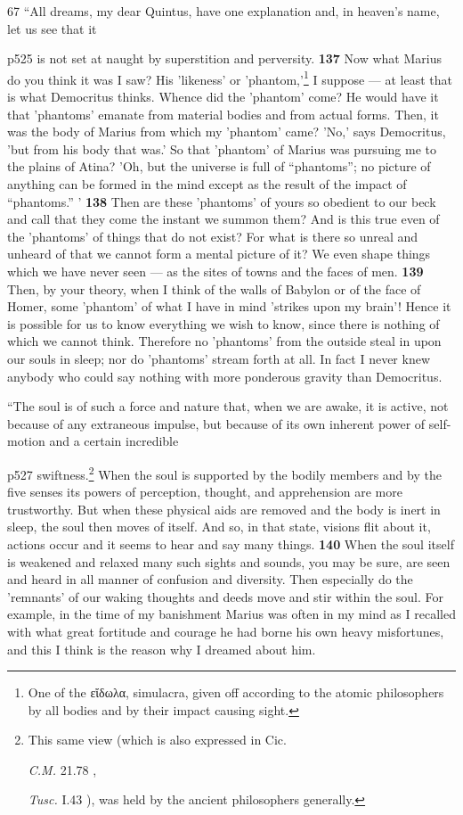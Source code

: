 67
``All dreams, my dear Quintus, have one explanation and, in heaven's name, let us see that it

p525 is not set at naught by superstition and perversity. \textbf{137} Now what Marius do you think it was I saw? His 'likeness' or 'phantom,'\texthebrew{}\footnote{One of the \textgreek{ε\texthebrew{ἴ}δωλα}, simulacra, given off according to the atomic philosophers by all bodies and by their impact causing sight.

} I suppose \texthebrew{—} at least that is what Democritus thinks. Whence did the 'phantom' come? He would have it that 'phantoms' emanate from material bodies and from actual forms. Then, it was the body of Marius from which my 'phantom' came? 'No,' says Democritus, 'but from his body that was.' So that 'phantom' of Marius was pursuing me to the plains of Atina? 'Oh, but the universe is full of ``phantoms''; no picture of anything can be formed in the mind except as the result of the impact of ``phantoms.'' ' \textbf{138} Then are these 'phantoms' of yours so obedient to our beck and call that they come the instant we summon them? And is this true even of the 'phantoms' of things that do not exist? For what is there so unreal and unheard of that we cannot form a mental picture of it? We even shape things which we have never seen \texthebrew{—} as the sites of towns and the faces of men. \textbf{139} Then, by your theory, when I think of the walls of Babylon or of the face of Homer, some 'phantom' of what I have in mind 'strikes upon my brain'! Hence it is possible for us to know everything we wish to know, since there is nothing of which we cannot think. Therefore no 'phantoms' from the outside steal in upon our souls in sleep; nor do 'phantoms' stream forth at all. In fact I never knew anybody who could say nothing with more ponderous gravity than Democritus.

``The soul is of such a force and nature that, when we are awake, it is active, not because of any extraneous impulse, but because of its own inherent power of self-motion and a certain incredible

p527 swiftness.\texthebrew{}\footnote{This same view (which is also expressed in Cic.

\emph{C.M.} 21.78 ,

\emph{Tusc.} I.43 ), was held by the ancient philosophers generally.

} When the soul is supported by the bodily members and by the five senses its powers of perception, thought, and apprehension are more trustworthy. But when these physical aids are removed and the body is inert in sleep, the soul then moves of itself. And so, in that state, visions flit about it, actions occur and it seems to hear and say many things. \textbf{140} When the soul itself is weakened and relaxed many such sights and sounds, you may be sure, are seen and heard in all manner of confusion and diversity. Then especially do the 'remnants' of our waking thoughts and deeds move and stir within the soul. For example, in the time of my banishment Marius was often in my mind as I recalled with what great fortitude and courage he had borne his own heavy misfortunes, and this I think is the reason why I dreamed about him.

